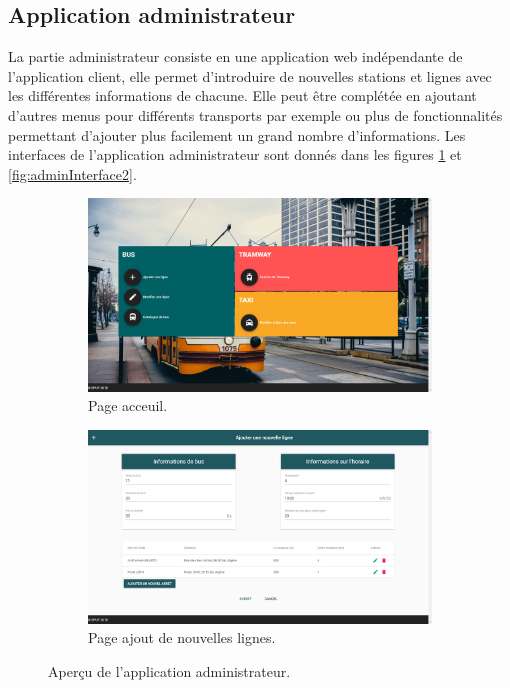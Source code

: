 \subsection{Application administrateur}
La partie administrateur consiste en une application web indépendante de l'application client, elle permet d'introduire de nouvelles stations et lignes avec les différentes informations de chacune.
Elle peut être complétée en ajoutant d'autres menus pour différents transports par exemple ou plus de fonctionnalités permettant d'ajouter plus facilement un grand nombre d'informations.\newline
Les interfaces de l'application administrateur sont donnés dans les figures \ref{fig:adminInterface} et \ref{fig:adminInterface2}.
\begin{figure}[h!]
	 \begin{subfigure}[b]{\linewidth}
	 	\includegraphics[width=\linewidth]{img/spuf/adminmenu.png}
	 	\caption{Page acceuil.}
	 \end{subfigure}
	 
	 \begin{subfigure}[b]{\linewidth}
	 	\includegraphics[width=\linewidth]{img/spuf/addline.png}
	 	\caption{Page ajout de nouvelles lignes.}
	 \end{subfigure}
	 \caption{Aperçu de l'application administrateur.}
	 \label{fig:adminInterface}
\end{figure}

